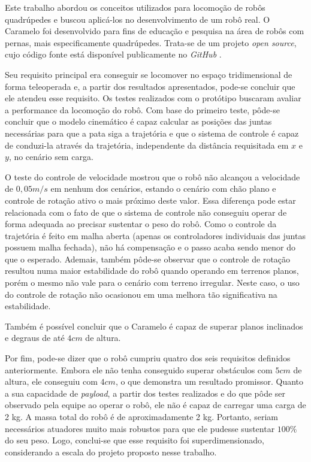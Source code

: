 \documentclass[../main.tex]{subfiles}
\begin{document}
  Este trabalho abordou os conceitos utilizados para locomoção de robôs quadrúpedes e buscou aplicá-los no desenvolvimento de um robô real. O Caramelo foi desenvolvido para fins de educação e pesquisa na área de robôs com pernas, mais especificamente quadrúpedes. Trata-se de um projeto \textit{open source}, cujo código fonte está disponível publicamente no \textit{GitHub} \cite{caramel_repo}. 
  
  Seu requisito principal era conseguir se locomover no espaço tridimensional de forma teleoperada e, a partir dos resultados apresentados, pode-se concluir que ele atendeu esse requisito. Os testes realizados com o protótipo buscaram avaliar a performance da locomoção do robô. Com base do primeiro teste, pôde-se concluir que o modelo cinemático é capaz calcular as posições das juntas necessárias para que a pata siga a trajetória e que o sistema de controle é capaz de conduzi-la através da trajetória, independente da distância requisitada em $x$ e $y$, no cenário sem carga. 
  
  O teste do controle de velocidade mostrou que o robô não alcançou a velocidade de $0,05 m/s$ em nenhum dos cenários, estando o cenário com chão plano e controle de rotação ativo o mais próximo deste valor. Essa diferença pode estar relacionada com o fato de que o sistema de controle não conseguiu operar de forma adequada ao precisar sustentar o peso do robô. Como o controle da trajetória é feito em malha aberta (apenas os controladores individuais das juntas possuem malha fechada), não há compensação e o passo acaba sendo menor do que o esperado. Ademais, também pôde-se observar que o controle de rotação resultou numa maior estabilidade do robô quando operando em terrenos planos, porém o mesmo não vale para o cenário com terreno irregular. Neste caso, o uso do controle de rotação não ocasionou em uma melhora tão significativa na estabilidade.
  
  Também é possível concluir que o Caramelo é capaz de superar planos inclinados e degraus de até $4cm$ de altura. 

  Por fim, pode-se dizer que o robô cumpriu quatro dos seis requisitos definidos anteriormente. Embora ele não tenha conseguido superar obstáculos com $5cm$ de altura, ele conseguiu com $4cm$, o que demonstra um resultado promissor. Quanto a sua capacidade de \textit{payload}, a partir dos testes realizados e do que pôde ser observado pela equipe ao operar o robô, ele não é capaz de carregar uma carga de 2 kg. A massa total do robô é de aproximadamente 2 kg. Portanto, seriam necessários atuadores muito mais robustos para que ele pudesse sustentar $100\%$ do seu peso. Logo, conclui-se que esse requisito foi superdimensionado, considerando a escala do projeto proposto nesse trabalho.
\end{document}
